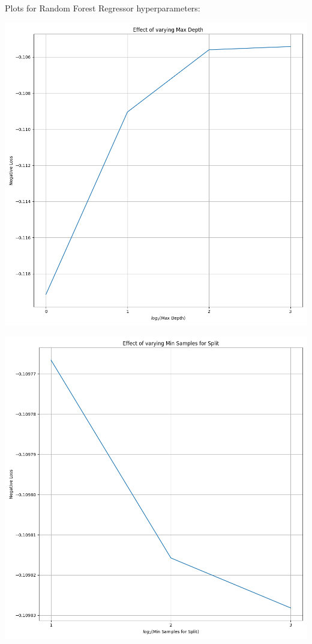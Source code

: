 \documentclass[12pt, letterpaper]{article}
\begin{document}
Plots for Random Forest Regressor hyperparameters:

\includegraphics[scale=\myscale]{random_forest_regressor_Max Depth.png}

\includegraphics[scale=\myscale]{random_forest_regressor_Min Samples for Split.png}
\end{document}

